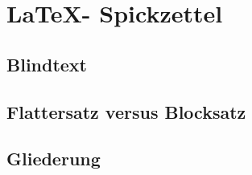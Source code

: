 %
\section{\LaTeX - Spickzettel}\label{sec:LaTeX-Spickzettel}

\subsection{Blindtext}\label{sec:blindtext}

\blindtext[1]
\blindtext[1]

\subsection{Flattersatz versus Blocksatz}\label{sec:Flattersatz-versus-Blocksatz}

\begin{flushleft}
\blindtext[1]
\end{flushleft}

\begin{flushright}
\blindtext[1]
\end{flushright}

\begin{center}
\blindtext[1]
\end{center}

\newpage

\subsection{Gliederung}

